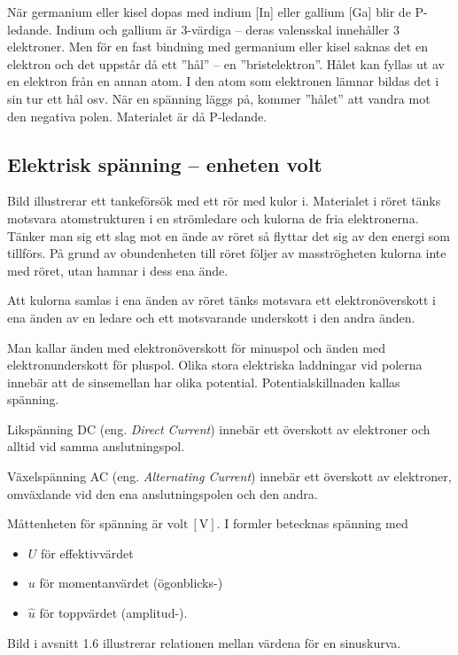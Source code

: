 När germanium eller kisel dopas med indium [In] eller gallium [Ga] blir de
P-ledande.
Indium och gallium är 3-värdiga -- deras valensskal innehåller 3 elektroner.
Men för en fast bindning med germanium eller kisel saknas det en elektron och
det uppstår då ett ''hål'' -- en ''bristelektron''.
Hålet kan fyllas ut av en elektron från en annan atom.
I den atom som elektronen lämnar bildas det i sin tur ett hål osv.
När en spänning läggs på, kommer ''hålet'' att vandra mot den negativa polen.
Materialet är då P-ledande.

\subsection{Elektrisk spänning -- enheten volt}
\label{spänning}


Bild  illustrerar ett tankeförsök med ett rör med kulor i.
Materialet i röret tänks motsvara atomstrukturen i en strömledare och kulorna
de fria elektronerna.
Tänker man sig ett slag mot en ände av röret så flyttar det sig av den energi
som tillförs.
På grund av obundenheten till röret följer av masströgheten kulorna inte med
röret, utan hamnar i dess ena ände.

Att kulorna samlas i ena änden av röret tänks motsvara ett elektronöverskott i
ena änden av en ledare och ett motsvarande underskott i den andra änden.

Man kallar änden med elektronöverskott för minuspol och änden med
elektronunderskott för pluspol.
Olika stora elektriska laddningar vid polerna innebär att de sinsemellan har
olika potential.
Potentialskillnaden kallas spänning.

Likspänning DC (eng. \emph{Direct Current}) innebär ett överskott av elektroner
och alltid vid samma anslutningspol.

Växelspänning AC (eng. \emph{Alternating Current}) innebär ett överskott av
elektroner, omväxlande vid den ena anslutningspolen och den andra.

Måttenheten för spänning är \(\mathrm{volt\ [V]}\).
I formler betecknas spänning med
\begin{itemize}
  \item \(U\) för effektivvärdet
  \item \(u\) för momentanvärdet (ögonblicks-)
  \item \(\hat{u}\) för toppvärdet (amplitud-).
\end{itemize}
Bild  i avsnitt 1.6 illustrerar relationen mellan värdena
för en sinuskurva.

